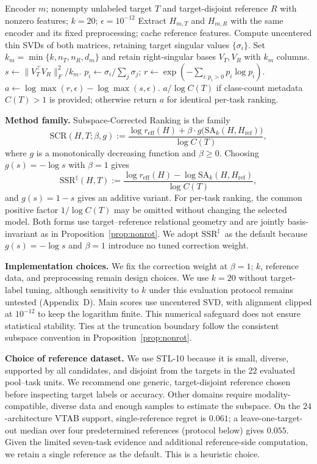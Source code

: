 \documentclass{article}
\newcommand{\reff}{\ensuremath{r_{\mathrm{eff}}}\xspace}
\newcommand{\SAk}{\ensuremath{\mathrm{SA}_k}\xspace}
\newcommand{\SSRdag}{\ensuremath{\mathrm{SSR}^{\ddagger}}\xspace}
\begin{document}
\begin{algorithm}[t]
\caption{Zero-label \SSRdag\ scoring for one candidate}
\label{alg:ssr_score}
\begin{algorithmic}[1]
\Require Encoder $m$; nonempty unlabeled target $T$ and target-disjoint reference $R$ with nonzero features; $k=20$; $\epsilon=10^{-12}$
\State Extract $H_{m,T}$ and $H_{m,R}$ with the same encoder and its fixed preprocessing; cache reference features.
\State Compute uncentered thin SVDs of both matrices, retaining target singular values $\{\sigma_i\}$.
\State Set $k_m=\min\{k,n_T,n_R,d_m\}$ and retain right-singular bases $V_T,V_R$ with $k_m$ columns.
\State $s\gets \lVert V_T^\top V_R\rVert_F^2/k_m$.
\State $p_i\gets \sigma_i/\sum_j\sigma_j$; $r\gets\exp(-\sum_{i:p_i>0}p_i\log p_i)$.
\State $a\gets\log\max(r,\epsilon)-\log\max(s,\epsilon)$.
\State \Return $a/\log C(T)$ if class-count metadata $C(T)>1$ is provided; otherwise return $a$ for identical per-task ranking.
\end{algorithmic}
\end{algorithm}

\textbf{Method family.} Subspace-Corrected Ranking is the family
\[
  \mathrm{SCR}(H, T; \beta, g) :=
  \frac{\log\reff(H) + \beta\cdot g\bigl(\SAk(H, H_{\mathrm{ref}})\bigr)}
       {\log C(T)},
\]
where $g$ is a monotonically decreasing function and $\beta \geq 0$.  Choosing $g(s) = -\log s$ with $\beta = 1$ gives
\[
  \SSRdag(H, T) := \frac{\log\reff(H) - \log\SAk(H, H_{\mathrm{ref}})}{\log C(T)},
\]
and $g(s)=1-s$ gives an additive variant. For per-task ranking, the common positive factor $1/\log C(T)$ may be omitted without changing the selected model. Both forms use target--reference relational geometry and are jointly basis-invariant as in Proposition~\ref{prop:nonrot}. We adopt \SSRdag\ as the default because $g(s)=-\log s$ and $\beta=1$ introduce no tuned correction weight.

\textbf{Implementation choices.} We fix the correction weight at $\beta=1$; $k$, reference data, and preprocessing remain design choices. We use $k=20$ without target-label tuning, although sensitivity to $k$ under this evaluation protocol remains untested (Appendix~D). Main scores use uncentered SVD, with alignment clipped at $10^{-12}$ to keep the logarithm finite. This numerical safeguard does not ensure statistical stability. Ties at the truncation boundary follow the consistent subspace convention in Proposition~\ref{prop:nonrot}.

\textbf{Choice of reference dataset.} We use STL-10 because it is small, diverse, supported by all candidates, and disjoint from the targets in the $22$ evaluated pool--task units. We recommend one generic, target-disjoint reference chosen before inspecting target labels or accuracy. Other domains require modality-compatible, diverse data and enough samples to estimate the subspace. On the $24$-architecture VTAB support, single-reference regret is $0.061$; a leave-one-target-out median over four predetermined references (protocol below) gives $0.055$. Given the limited seven-task evidence and additional reference-side computation, we retain a single reference as the default. This is a heuristic choice.
\end{document}
